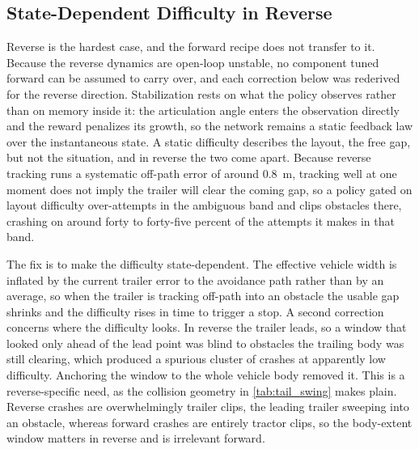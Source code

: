 

\subsection{State-Dependent Difficulty in Reverse}
\label{sec:reverse_dynamic_difficulty}

Reverse is the hardest case, and the forward recipe does not transfer to it. Because the reverse dynamics are open-loop unstable, no component tuned forward can be assumed to carry over, and each correction below was rederived for the reverse direction. Stabilization rests on what the policy observes rather than on memory inside it: the articulation angle enters the observation directly and the reward penalizes its growth, so the network remains a static feedback law over the instantaneous state. A static difficulty describes the layout, the free gap, but not the situation, and in reverse the two come apart. Because reverse tracking runs a systematic off-path error of around $0.8$~m, tracking well at one moment does not imply the trailer will clear the coming gap, so a policy gated on layout difficulty over-attempts in the ambiguous band and clips obstacles there, crashing on around forty to forty-five percent of the attempts it makes in that band.

The fix is to make the difficulty state-dependent. The effective vehicle width is inflated by the current trailer error to the avoidance path rather than by an average, so when the trailer is tracking off-path into an obstacle the usable gap shrinks and the difficulty rises in time to trigger a stop. A second correction concerns where the difficulty looks. In reverse the trailer leads, so a window that looked only ahead of the lead point was blind to obstacles the trailing body was still clearing, which produced a spurious cluster of crashes at apparently low difficulty. Anchoring the window to the whole vehicle body removed it. This is a reverse-specific need, as the collision geometry in \cref{tab:tail_swing} makes plain. Reverse crashes are overwhelmingly trailer clips, the leading trailer sweeping into an obstacle, whereas forward crashes are entirely tractor clips, so the body-extent window matters in reverse and is irrelevant forward.



